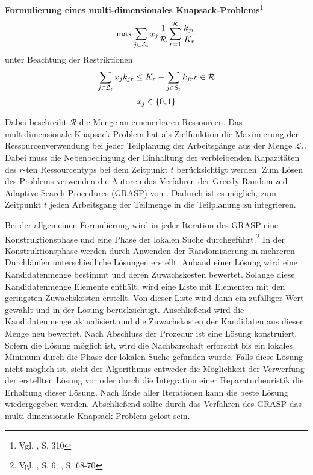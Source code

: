 \documentclass[a4paper,12pt,normalheadings,footexclude,headinclude,liststotoc,nochapterprefix,onecolumn,oneside,parskip,pointlessnumbers]{scrreprt}
\begin{document}
\textbf{Formulierung eines multi-dimensionales Knapsack-Problems}\footnote{Vgl. \cite{valls2004population}, S. 310}
\begin{eqnarray} 
\max \sum_{j\in \mathcal{L}_{t}}x_{j}\frac{1}{\mathcal{R}}\sum^{\mathcal{R}}_{r=1}\frac{k_{jr}}{K_{r}}
\hfill
\end{eqnarray}
unter Beachtung der Restriktionen
\begin{multline}
\sum_{j\in \mathcal{L}_{t}}x_{j}k_{jr} \leq K_{r}-\sum_{j\in S_{t}}k_{jr} \hfill r \in \mathcal{R}
\end{multline}\vspace{-3.0ex}
\begin{multline}
x_{j} \in \{0,1\}
\hfill
\end{multline}\vspace{-3.0ex}

Dabei beschreibt $\mathcal{R}$ die Menge an erneuerbaren Ressourcen. Das multidimensionale Knapsack-Problem hat als Zielfunktion die Maximierung der Ressourcenverwendung bei jeder Teilplanung der Arbeitsgänge aus der Menge $\mathcal{L}_{t}$. Dabei muss die Nebenbedingung der Einhaltung der verbleibenden Kapazitäten des $r$-ten Ressourcentyps bei dem Zeitpunkt $t$ berücksichtigt werden. Zum Lösen des Problems verwenden die Autoren das Verfahren der Greedy Randomized Adaptive Search Procedures (GRASP) von \cite{feo1995greedy}. Dadurch ist es möglich, zum Zeitpunkt $t$ jeden Arbeitsgang der Teilmenge in die Teilplanung zu integrieren. 

Bei der allgemeinen Formulierung wird in jeder Iteration des GRASP eine Konstruktionsphase und eine Phase der lokalen Suche durchgeführt.\footnote{Vgl. \cite{resende2014grasp}, S. 6; \cite{feo1989probabilistic}, S. 68-70} In der Konstruktionsphase werden durch Anwenden der Randomisierung in mehreren Durchläufen unterschiedliche Lösungen erstellt. Anhand einer Lösung wird eine Kandidatenmenge bestimmt und deren Zuwachskosten bewertet. Solange diese Kandidatenmenge Elemente enthält, wird eine Liste mit Elementen mit den geringsten Zuwachskosten erstellt. Von dieser Liste wird dann ein zufälliger Wert gewählt und in der Lösung berücksichtigt. Anschließend wird die Kandidatenmenge aktualisiert und die Zuwachskosten der Kandidaten aus dieser Menge neu bewertet. Nach Abschluss der Prozedur ist eine Lösung konstruiert. Sofern die Lösung möglich ist, wird die Nachbarschaft erforscht bis ein lokales Minimum durch die Phase der lokalen Suche gefunden wurde. Falls diese Lösung nicht möglich ist, sieht der Algorithmus entweder die Möglichkeit der Verwerfung der erstellten Lösung vor oder durch die Integration einer Reparaturheuristik die Erhaltung dieser Lösung. Nach Ende aller Iterationen kann die beste Lösung wiedergegeben werden. Abschließend sollte durch das Verfahren des GRASP das multi-dimensionale Knapsack-Problem gelöst sein. 
\end{document}
